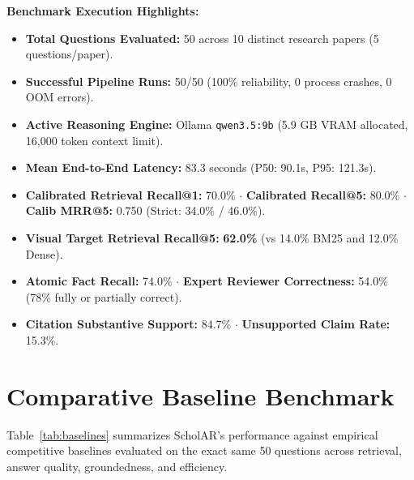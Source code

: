 \documentclass[10pt,a4paper]{article}
\begin{document}
\vspace{6pt}
\begin{tcolorbox}[colback=cardbg,colframe=darkteal!80,boxrule=1pt,arc=3pt]
\textbf{\large Benchmark Execution Highlights:}
\begin{itemize}\setlength\itemsep{2pt}
    \item \textbf{Total Questions Evaluated:} 50 across 10 distinct research papers (5 questions/paper).
    \item \textbf{Successful Pipeline Runs:} 50/50 (100\% reliability, 0 process crashes, 0 OOM errors).
    \item \textbf{Active Reasoning Engine:} Ollama \texttt{qwen3.5:9b} (5.9 GB VRAM allocated, 16,000 token context limit).
    \item \textbf{Mean End-to-End Latency:} 83.3 seconds (P50: 90.1s, P95: 121.3s).
    \item \textbf{Calibrated Retrieval Recall@1:} 70.0\% $\cdot$ \textbf{Calibrated Recall@5:} 80.0\% $\cdot$ \textbf{Calib MRR@5:} 0.750 (Strict: 34.0\% / 46.0\%).
    \item \textbf{Visual Target Retrieval Recall@5:} \textbf{62.0\%} (vs 14.0\% BM25 and 12.0\% Dense).
    \item \textbf{Atomic Fact Recall:} 74.0\% $\cdot$ \textbf{Expert Reviewer Correctness:} 54.0\% (78\% fully or partially correct).
    \item \textbf{Citation Substantive Support:} 84.7\% $\cdot$ \textbf{Unsupported Claim Rate:} 15.3\%.
\end{itemize}
\end{tcolorbox}

\section{Comparative Baseline Benchmark}

Table~\ref{tab:baselines} summarizes ScholAR's performance against empirical competitive baselines evaluated on the exact same 50 questions across retrieval, answer quality, groundedness, and efficiency.
\end{document}
